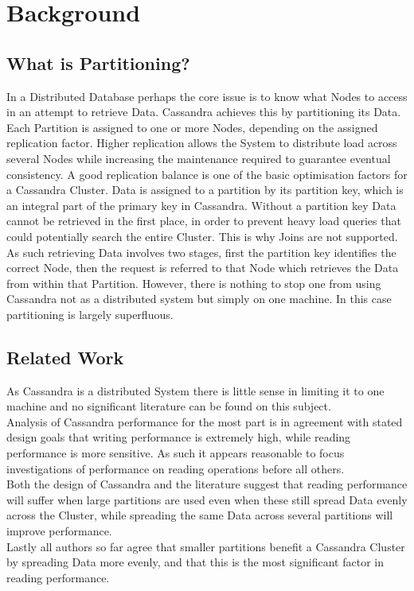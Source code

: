\documentclass{template/csfourzero}
\begin{document}
\section{Background} %
\label{sec:lit}

  \subsection{What is Partitioning?}
  In a Distributed Database perhaps the core issue is to know what Nodes to access in an attempt to retrieve Data. Cassandra achieves this by partitioning its Data. Each Partition is assigned to one or more Nodes, depending on the assigned replication factor. Higher replication allows the System to distribute load across several Nodes while increasing the maintenance required to guarantee eventual consistency. A good replication balance is one of the basic optimisation factors for a Cassandra Cluster. \cite{cassandraBasics}
  Data is assigned to a partition by its partition key, which is an integral part of the primary key in Cassandra. Without a partition key Data cannot be retrieved in the first place, in order to prevent heavy load queries that could potentially search the entire Cluster. This is why Joins are not supported.\cite{cassandraKey}
  As such retrieving Data involves two stages, first the partition key identifies the correct Node, then the request is referred to that Node which retrieves the Data from within that Partition. \cite{cassandraRead}
  However, there is nothing to stop one from using Cassandra not as a distributed system but simply on one machine. In this case partitioning is largely superfluous. 
  
  \subsection{Related Work}
  As Cassandra is a distributed System there is little sense in limiting it to one machine and no significant literature can be found on this subject.
  \\
  Analysis of Cassandra performance for the most part is in agreement with stated design goals that writing performance is extremely high, while reading performance is more sensitive. \cite{cassandraBasics,ctoAnalysis} As such it appears reasonable to focus investigations of performance on reading operations before all others. 
  \\
  Both the design of Cassandra and the literature suggest that reading performance will suffer when large partitions are used even when these still spread Data evenly across the Cluster, while spreading the same Data across several partitions will improve performance. \cite{sherman,ctoAnalysis}
  \\
  Lastly all authors so far agree that smaller partitions benefit a Cassandra Cluster by spreading Data more evenly, and that this is the most significant factor in reading performance. \cite{casLimits,cassandraBenchmarks,ctoAnalysis,sherman,cassandraBasics}
  
\end{document}
